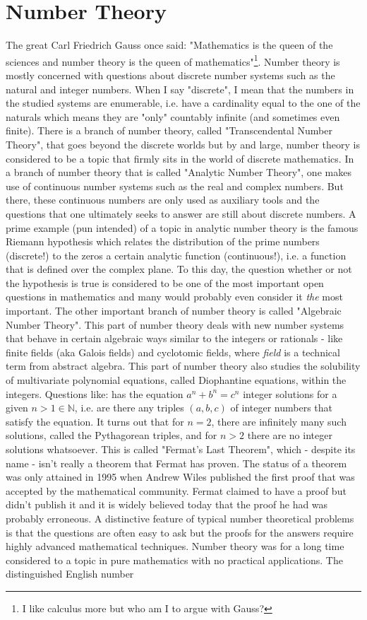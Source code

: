 \chapter{Number Theory}
The great Carl Friedrich Gauss once said: "Mathematics is the queen of the sciences and number theory is the queen of mathematics"\footnote{I like calculus more but who am I to argue with Gauss?}. Number theory is mostly concerned with questions about discrete number systems such as the natural and integer numbers. When I say "discrete", I mean that the numbers in the studied systems are enumerable, i.e. have a cardinality equal to the one of the naturals which means they are "only" countably infinite (and sometimes even finite). There is a branch of number theory, called "Transcendental Number Theory", that goes beyond the discrete worlds but by and large, number theory is considered to be a topic that firmly sits in the world of discrete mathematics. In a branch of number theory that is called "Analytic Number Theory", one makes use of continuous number systems such as the real and complex numbers. But there, these continuous numbers are only used as auxiliary tools and the questions that one ultimately seeks to answer are still about discrete numbers. A prime example (pun intended) of a topic in analytic number theory is the famous Riemann hypothesis which relates the distribution of the prime numbers (discrete!) to the zeros a certain analytic function (continuous!), i.e. a function that is defined over the complex plane. To this day, the question whether or not the hypothesis is true is considered to be one of the most important open questions in mathematics and many would probably even consider it \emph{the} most important. The other important branch of number theory is called "Algebraic Number Theory". This part of number theory deals with new number systems that behave in certain algebraic ways similar to the integers or rationals - like finite fields (aka Galois fields) and cyclotomic fields, where \emph{field} is a technical term from abstract algebra. This part of number theory also studies the solubility of multivariate polynomial equations, called Diophantine equations, within the integers. Questions like: has the equation $a^n + b^n = c^n$ integer solutions for a given $n > 1 \in \mathbb{N}$, i.e. are there any triples $(a,b,c)$ of integer numbers that satisfy the equation. It turns out that for $n=2$, there are infinitely many such solutions, called the Pythagorean triples, and for $n > 2$ there are no integer solutions whatsoever. This is called "Fermat's Last Theorem", which - despite its name - isn't really a theorem that Fermat has proven. The status of a theorem was only attained in 1995 when Andrew Wiles published the first proof that was accepted by the mathematical community. Fermat claimed to have a proof but didn't publish it and it is widely believed today that the proof he had was probably erroneous. A distinctive feature of typical number theoretical problems is that the questions are often easy to ask but the proofs for the answers require highly advanced mathematical techniques. Number theory was for a long time considered to a topic in pure mathematics with no practical applications. The distinguished English number 
